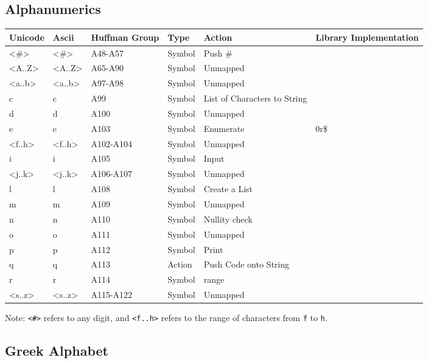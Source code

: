 \documentclass{article}
\begin{document}
\subsection{Alphanumerics}

\begin{tabular}{| >{\ttfamily}l| >{\ttfamily}l| >{\ttfamily}l|l|l| >{\ttfamily}l|}
    \hline
    \textbf{Unicode} & \textbf{Ascii} & \textbf{Huffman Group}& \textbf{Type} & \textbf{Action} & \textbf{Library Implementation}\\
    \hline
    <\#> & <\#> & A48-A57 & Symbol & Push \# & \\
    <A..Z> & <A..Z> & A65-A90 & Symbol & Unmapped & \\
    <a..b> & <a..b> & A97-A98 & Symbol & Unmapped & \\
    c & c & A99 & Symbol & List of Characters to String & \\
    d & d & A100 & Symbol & Unmapped & \\
    e & e & A103 & Symbol & Enumerate & 0r\$\\
    <f..h> & <f..h> & A102-A104 & Symbol & Unmapped & \\
    i & i & A105 & Symbol & Input & \\
    <j..k> & <j..k> & A106-A107 & Symbol & Unmapped & \\
    l & l & A108 & Symbol & Create a List & \\
    m & m & A109 & Symbol & Unmapped & \\
    n & n & A110 & Symbol & Nullity check & \\
    o & o & A111 & Symbol & Unmapped & \\
    p & p & A112 & Symbol & Print & \\
    q & q & A113 & Action & Push Code onto String & \\
    r & r & A114 & Symbol & range & \\
    <s..z> & <s..z> & A115-A122 & Symbol & Unmapped & \\
    \hline
\end{tabular}

Note: \texttt{<\#>} refers to any digit, and \texttt{<f..h>} refers to the range of characters from
    \texttt f to \texttt h.

\subsection{Greek Alphabet}
\end{document}
